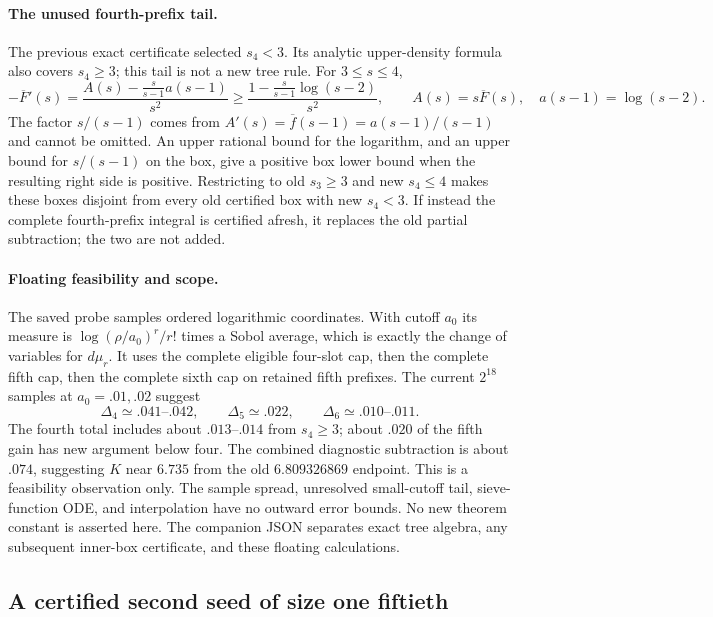 \documentclass[11pt]{article}
\begin{document}
\paragraph{The unused fourth-prefix tail.}
The previous exact certificate selected $s_4<3$. Its analytic
upper-density formula also covers $s_4\ge3$; this tail is not a
new tree rule. For $3\le s\le4$,
\[
 -\overline F'(s)=\frac{A(s)-\frac{s}{s-1}a(s-1)}{s^2}
 \ge\frac{1-\frac{s}{s-1}\log(s-2)}{s^2},
 \qquad A(s)=s\overline F(s),\quad a(s-1)=\log(s-2).
\]
The factor $s/(s-1)$ comes from
$A'(s)=\overline f(s-1)=a(s-1)/(s-1)$ and cannot be omitted.
An upper rational bound for the logarithm, and an upper bound
for $s/(s-1)$ on the box, give a positive box lower bound when
the resulting right side is positive.
Restricting to old $s_3\ge3$ and new $s_4\le4$ makes these boxes
disjoint from every old certified box with new $s_4<3$.
If instead the complete fourth-prefix integral is certified afresh,
it replaces the old partial subtraction; the two are not added.

\paragraph{Floating feasibility and scope.}
The saved probe samples ordered logarithmic coordinates. With
cutoff $a_0$ its measure is
$\log(\rho/a_0)^r/r!$ times a Sobol average, which is exactly
the change of variables for $d\mu_r$. It uses the complete
eligible four-slot cap, then the complete fifth cap, then the
complete sixth cap on retained fifth prefixes. The current
$2^{18}$ samples at $a_0=.01,.02$ suggest
\[
 \Delta_4\simeq .041\text{--}.042,
 \qquad\Delta_5\simeq .022,
 \qquad\Delta_6\simeq .010\text{--}.011.
\]
The fourth total includes about $.013$--$.014$ from $s_4\ge3$;
about $.020$ of the fifth gain has new argument below four.
The combined diagnostic subtraction is about $.074$, suggesting
$K$ near $6.735$ from the old $6.809326869$ endpoint. This is
a feasibility observation only. The sample spread, unresolved
small-cutoff tail, sieve-function ODE, and interpolation have no
outward error bounds. No new theorem constant is asserted here.
The companion JSON separates exact tree algebra, any subsequent
inner-box certificate, and these floating calculations.

\subsection{A certified second seed of size one fiftieth}
\label{sec:second-seed-omega-certified}
\end{document}
